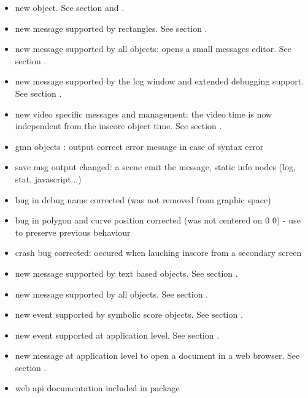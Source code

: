 \begin{itemize}
\item new  object. See section  and  .
\item new  message supported by rectangles. See section .
\item new  message supported by all objects: opens a small messages editor. See section .
\item new  message supported by the log window and extended debugging support. See section .
\item new video specific messages and management: the video time is now independent from the 
  inscore object time. See section .
\item gmn objects : output correct error message in case of syntax error
\item save msg output changed: a scene emit the  message, static info nodes (log, stat, javascript...)
\item bug in debug name corrected (was not removed from graphic space)
\item bug in polygon and curve position corrected (was not centered on 0 0) - use  
  to preserve previous behaviour
\item crash bug corrected: occured when lauching inscore from a secondary screen
\item new  message supported by text based objects. See section .
\end{itemize}

\begin{itemize}
\item new  message supported by all objects. See section .
\item new  event supported by symbolic score objects. See section .
\item new  event supported at application level. See section .
\item new  message at application level to open a document in a web browser. See section .
\item web api documentation included in package
\end{itemize}

